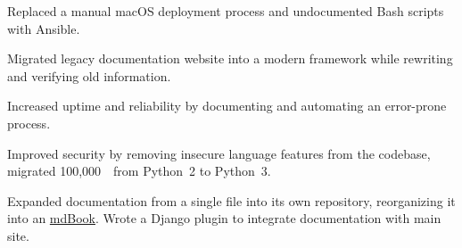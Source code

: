 \documentclass{article}
\begin{document}

\begin{job}[company={Brandeis University},
	city={Waltham, \textsc{ma}},
	dates=February 2019--, title=Systems Administrator,
	supervisor=Christopher Allison,
	supervisorcontact=\email{chris@cs.brandeis.edu},
	]
\item Replaced a manual macOS deployment process and undocumented Bash
scripts with Ansible.
\item Migrated legacy documentation website into a modern framework while
rewriting and verifying old information. 
\end{job}

\begin{job}[samecompany,
	city={Waltham, \textsc{ma}},
	dates=September 2018--January 2019, title=Lead Software Engineer,
	supervisor=Priyanka Renugopalakrishnan,
	supervisorcontact=\email{priyankarina@brandeis.edu}]

\item Increased uptime and reliability by documenting and automating
an error-prone process. 

\item Improved security by removing insecure language features from
the codebase, migrated 100,000~\sloc\ from Python~2 to Python~3.

\item Expanded documentation from a single file into its own repository,
reorganizing it into an
\href{https://github.com/rust-lang-nursery/mdBook}{mdBook}. Wrote a Django
plugin to integrate documentation with main site. 



\end{job}
\end{document}

